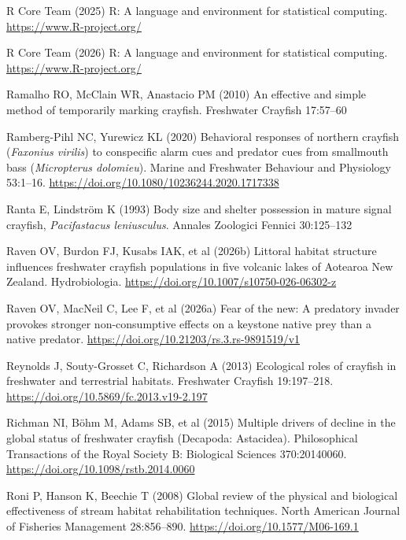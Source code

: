 \documentclass[
  12pt,
  a4paper,
  oneside]{scrbook}
\newlength{\cslhangindent}
\newenvironment{CSLReferences}[2] %
 {\begin{list}{}{%
  \setlength{\itemindent}{0pt}
  \setlength{\leftmargin}{0pt}
  \setlength{\parsep}{0pt}
  \ifodd #1
   \setlength{\leftmargin}{\cslhangindent}
   \setlength{\itemindent}{-1\cslhangindent}
  \fi
  \setlength{\itemsep}{#2\baselineskip}}}
 {\end{list}}
\renewenvironment{CSLReferences}[2]
   {\begin{list}{}{%
    \setlength{\itemindent}{0pt}
    \setlength{\leftmargin}{0pt}
    \setlength{\parsep}{0pt}
    \ifodd #1
     \setlength{\leftmargin}{\cslhangindent}
     \setlength{\itemindent}{-1\cslhangindent}
    \fi
    \setlength{\itemsep}{0.3\baselineskip}}}
   {\end{list}}%
\begin{document}
\begin{CSLReferences}{1}{1}
R Core Team (2025) {R}: A language and environment for statistical
computing. \url{https://www.R-project.org/}

R Core Team (2026) {R}: A language and environment for statistical
computing. \url{https://www.R-project.org/}

Ramalho RO, McClain WR, Anastacio PM (2010) An effective and simple
method of temporarily marking crayfish. Freshwater Crayfish 17:57--60

Ramberg-Pihl NC, Yurewicz KL (2020) Behavioral responses of northern
crayfish ({\emph{Faxonius virilis}}) to conspecific alarm cues and
predator cues from smallmouth bass ({\emph{Micropterus dolomieu}}).
Marine and Freshwater Behaviour and Physiology 53:1--16.
\url{https://doi.org/10.1080/10236244.2020.1717338}

Ranta E, Lindström K (1993) Body size and shelter possession in mature
signal crayfish, {\emph{Pacifastacus leniusculus}}. Annales Zoologici
Fennici 30:125--132

Raven OV, Burdon FJ, Kusabs IAK, et al (2026b) Littoral habitat
structure influences freshwater crayfish populations in five volcanic
lakes of {Aotearoa New Zealand}. Hydrobiologia.
\url{https://doi.org/10.1007/s10750-026-06302-z}

Raven OV, MacNeil C, Lee F, et al (2026a) Fear of the new: A predatory
invader provokes stronger non-consumptive effects on a keystone native
prey than a native predator.
\url{https://doi.org/10.21203/rs.3.rs-9891519/v1}

Reynolds J, Souty-Grosset C, Richardson A (2013) Ecological roles of
crayfish in freshwater and terrestrial habitats. Freshwater Crayfish
19:197--218. \url{https://doi.org/10.5869/fc.2013.v19-2.197}

Richman NI, Böhm M, Adams SB, et al (2015) Multiple drivers of decline
in the global status of freshwater crayfish ({Decapoda: Astacidea}).
Philosophical Transactions of the Royal Society B: Biological Sciences
370:20140060. \url{https://doi.org/10.1098/rstb.2014.0060}

Roni P, Hanson K, Beechie T (2008) Global review of the physical and
biological effectiveness of stream habitat rehabilitation techniques.
North American Journal of Fisheries Management 28:856--890.
\url{https://doi.org/10.1577/M06-169.1}


\end{CSLReferences}
\end{document}
